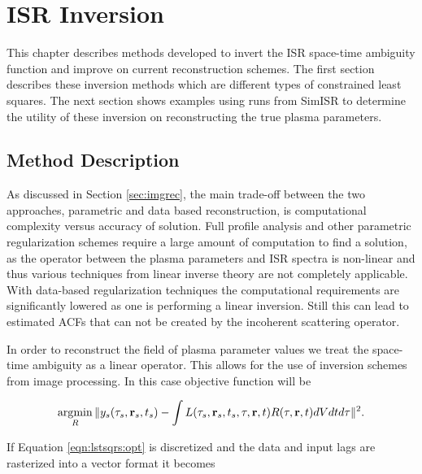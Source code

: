 \chapter{ISR Inversion}
\label{chapter:inversion}
\thispagestyle{myheadings}

\graphicspath{{5_Inversions/Figures/}}

This chapter describes methods developed to invert the ISR space-time ambiguity function and improve on current reconstruction schemes. The first section describes these inversion methods which are different types of constrained least squares. The next section shows examples using runs from SimISR to determine the utility of these inversion on reconstructing the true plasma parameters.

\section{Method Description}
As discussed in Section \ref{sec:imgrec}, the main trade-off between the two approaches, parametric and data based reconstruction, is computational complexity versus accuracy of solution. Full profile analysis and other parametric regularization schemes require a large amount of computation to find a solution, as the operator between the plasma parameters and ISR spectra is non-linear and thus various techniques from linear inverse theory are not completely applicable. With data-based regularization techniques the computational requirements are significantly lowered as one is performing a linear inversion. Still this can lead to estimated ACFs that can not be created by the incoherent scattering operator.

In order to reconstruct the field of plasma parameter values we treat the space-time ambiguity as a linear operator. This allows for the use of inversion schemes from image processing. In this case objective function will be 

\begin{equation}
\label{eqn:lstsqrs:opt}
\operatorname*{\arg\!\min}\limits_{R} \| y_s(\tau_s,\mathbf{r}_s,t_s)- \int L(\tau_s,\mathbf{r}_s,t_s,\tau,\mathbf{r},t)R(\tau,\mathbf{r},t)dVdtd\tau \|^2.
\end{equation}

\noindent If Equation \ref{eqn:lstsqrs:opt} is discretized and the data and input lags are rasterized into a vector format it becomes 

